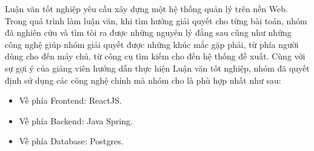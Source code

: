 Luận văn tốt nghiệp yêu cầu xây dựng một hệ thống quản lý trên nền Web. Trong quá trình làm luận văn, khi tìm hướng giải quyết cho từng bài toán, nhóm đã nghiên cứu và tìm tòi ra được những nguyên lý đằng sau cũng như những công nghệ giúp nhóm giải quyết được những khúc mắc gặp phải, từ phía người dùng cho đến máy chủ, từ công cụ tìm kiếm cho đến hệ thống đề xuất. Cùng với sự gợi ý của giảng viên hướng dẫn thực hiện Luận văn tốt nghiệp, nhóm đã quyết định sử dụng các công nghệ chính mà nhóm cho là phù hợp nhất như sau:

\begin{itemize}
    \item Về phía Frontend: ReactJS.
    \item Về phía Backend: Java Spring.
    \item Về phía Database: Postgres.
\end{itemize}